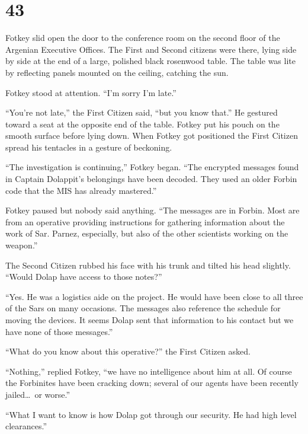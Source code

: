 
\chapter{43}

Fotkey slid open the door to the conference room on the second floor of the Argenian Executive
Offices. The First and Second citizens were there, lying side by side at the end of a large,
polished black rosenwood table. The table was lite by reflecting panels mounted on the ceiling,
catching the sun.

Fotkey stood at attention. ``I'm sorry I'm late.''

``You're not late,'' the First Citizen said, ``but you know that.'' He gestured toward a seat at
the opposite end of the table. Fotkey put his pouch on the smooth surface before lying down.
When Fotkey got positioned the First Citizen spread his tentacles in a gesture of beckoning.

``The investigation is continuing,'' Fotkey began. ``The encrypted messages found in Captain
Dolappit's belongings have been decoded. They used an older Forbin code that the MIS has already
mastered.''

Fotkey paused but nobody said anything. ``The messages are in Forbin. Most are from an operative
providing instructions for gathering information about the work of Sar. Parnez, especially, but
also of the other scientists working on the weapon.''


The Second Citizen rubbed his face with his trunk and tilted his head slightly. ``Would Dolap
have access to those notes?''

``Yes. He was a logistics aide on the project. He would have been close to all three of the Sars
on many occasions. The messages also reference the schedule for moving the devices. It seems
Dolap sent that information to his contact but we have none of those messages.''

``What do you know about this operative?'' the First Citizen asked.

``Nothing,'' replied Fotkey, ``we have no intelligence about him at all. Of course the
Forbinites have been cracking down; several of our agents have been recently jailed\ldots\ or
worse.''

``What I want to know is how Dolap got through our security. He had high level clearances.''

